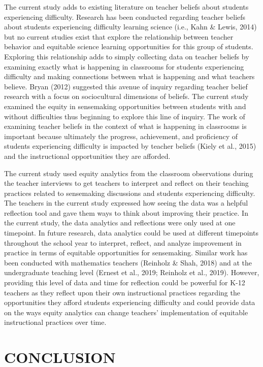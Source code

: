 \documentclass{sig-alternate} %
\begin{document}
\begin{large}
The current study adds to existing literature on teacher beliefs about students experiencing difficulty. Research has been conducted regarding teacher beliefs about students experiencing difficulty learning science (i.e., Kahn \& Lewis, 2014) but no current studies exist that explore the relationship between teacher behavior and equitable science learning opportunities for this group of students. Exploring this relationship adds to simply collecting data on teacher beliefs by examining exactly what is happening in classrooms for students experiencing difficulty and making connections between what is happening and what teachers believe. Bryan (2012) suggested this avenue of inquiry regarding teacher belief research with a focus on sociocultural dimensions of beliefs. The current study examined the equity in sensemaking opportunities between students with and without difficulties thus beginning to explore this line of inquiry. The work of examining teacher beliefs in the context of what is happening in classrooms is important because ultimately the progress, achievement, and proficiency of students experiencing difficulty is impacted by teacher beliefs (Kiely et al., 2015) and the instructional opportunities they are afforded. 

The current study used equity analytics from the classroom observations during the teacher interviews to get teachers to interpret and reflect on their teaching practices related to sensemaking discussions and students experiencing difficulty. The teachers in the current study expressed how seeing the data was a helpful reflection tool and gave them ways to think about improving their practice. In the current study, the data analytics and reflections were only used at one timepoint. In future research, data analytics could be used at different timepoints throughout the school year to interpret, reflect, and analyze improvement in practice in terms of equitable opportunities for sensemaking. Similar work has been conducted with mathematics teachers (Reinholz \& Shah, 2018) and at the undergraduate teaching level (Ernest et al., 2019; Reinholz et al., 2019). However, providing this level of data and time for reflection could be powerful for K-12 teachers as they reflect upon their own instructional practices regarding the opportunities they afford students experiencing difficulty and could provide data on the ways equity analytics can change teachers’ implementation of equitable instructional practices over time. 

\section*{CONCLUSION}


\end{large}
\end{document}
